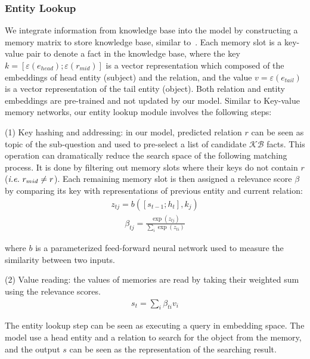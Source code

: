 \subsubsection{Entity Lookup}
We integrate information from knowledge base into the model by constructing a memory matrix to store knowledge base, similar to~\cite{DBLP:conf/emnlp/MillerFDKBW16}. Each memory slot is a key-value pair to denote a fact in the knowledge base, where the key $k=[\varepsilon(e_{head});\varepsilon(r_{mid})]$ is a vector representation which composed of the embeddings of head entity (subject) and the relation, and the value $v=\varepsilon(e_{tail})$ is a vector representation of the tail entity (object). Both relation and entity embeddings are pre-trained and not updated by our model. Similar to Key-value memory networks, our entity lookup module involves the following steps: 

(1) Key hashing and addressing: in our model, predicted relation $r$ can be seen as topic of the sub-question and used to pre-select a list of candidate $\mathcal{KB}$ facts. This operation can dramatically reduce the search space of the following matching process. It is done by filtering out memory slots where their keys do not contain $r$ ($\emph{i.e.}\ r_{mid}\neq r$). Each remaining memory slot is then assigned a relevance score $\beta$ by comparing its key with representations of previous entity and current relation: %
\begin{align}
z_{tj} = b([s_{t-1};h_t], k_j)
\end{align}
\vspace{-3ex}
\begin{align}
\beta_{tj} = \frac{\exp (z_{tj})}{\sum_i\exp (z_{ti})}
\end{align}

where $b$ is a parameterized feed-forward neural network used to measure the similarity between two inputs. 

(2) Value reading: the values of memories are read by taking their weighted sum using the relevance scores.
\begin{align}
s_t =\sum_{i}\beta_{ti}v_i
\end{align}

The entity lookup step can be seen as executing a query in embedding space. The model use a head entity and a relation to search for the object from the memory, and the output $s$ can be seen as the representation of the searching result. 

